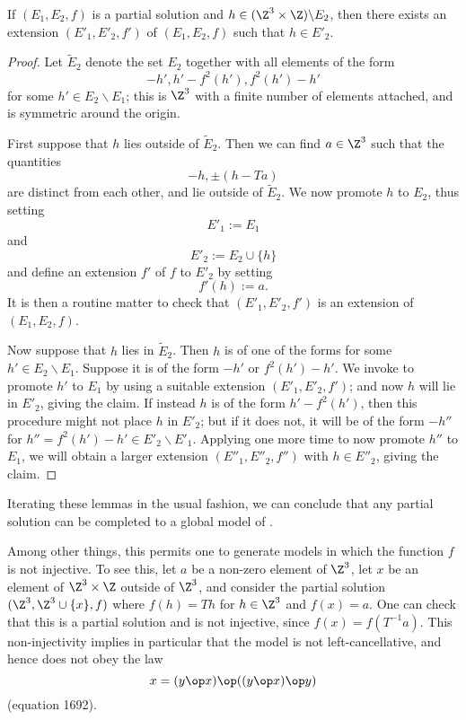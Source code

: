 \begin{lemma}[Promoting to $E_2$]\label{add-E2}  If $(E_1,E_2,f)$ is a partial solution and $h \in (\Z^3 \times \Z) \backslash E_2$, then there exists an extension $(E'_1,E'_2,f')$ of $(E_1,E_2,f)$ such that $h \in E'_2$.
\end{lemma}

\begin{proof}  Let $\tilde E_2$ denote the set $E_2$ together with all elements of the form
\begin{equation}\label{hp-form}
 -h', h' - f^2(h'), f^2(h') - h'
\end{equation}
for some $h' \in E_2 \backslash E_1$; this is $\Z^3$ with a finite number of elements attached, and is symmetric around the origin.

First suppose that $h$ lies outside of $\tilde E_2$.  Then we can find $a \in \Z^3$ such that the quantities
$$ -h, \pm (h - Ta)$$
are distinct from each other, and lie outside of $\tilde E_2$.  We now promote $h$ to $E_2$, thus setting
$$ E'_1 := E_1$$
and
$$ E'_2 := E_2 \cup \{h\}$$
and define an extension $f'$ of $f$ to $E'_2$ by setting
$$ f'(h) := a.$$
It is then a routine matter to check that $(E'_1,E'_2,f')$ is an extension of $(E_1,E_2,f)$.

Now suppose that $h$ lies in $\tilde E_2$.  Then $h$ is of one of the forms  for some $h' \in E_2 \backslash E_1$.  Suppose it is of the form $-h'$ or $f^2(h') - h'$.  We invoke  to promote $h'$ to $E_1$ by using a suitable extension $(E'_1,E'_2,f')$; and now $h$ will lie in $E'_2$, giving the claim.  If instead $h$ is of the form $h'-f^2(h')$, then this procedure might not place $h$ in $E'_2$; but if it does not, it will be of the form $-h''$ for $h'' = f^2(h')-h' \in E'_2 \backslash E'_1$.  Applying  one more time to now promote $h''$ to $E_1$, we will obtain a larger extension $(E''_1,E''_2,f'')$ with $h \in E''_2$, giving the claim.
\end{proof}

Iterating these lemmas in the usual fashion, we can conclude that any partial solution can be completed to a global model of .

Among other things, this permits one to generate models in which the function $f$ is not injective.  To see this, let $a$ be a non-zero element of $\Z^3$, let $x$ be an element of $\Z^3 \times \Z$ outside of $\Z^3$, and consider the partial solution $(\Z^3, \Z^3 \cup \{x\}, f)$ where $f(h) = Th$ for $h \in \Z^3$ and $f(x) = a$.  One can check that this is a partial solution and is not injective, since $f(x) = f(T^{-1} a)$.  This non-injectivity implies in particular that the model is not left-cancellative, and hence does not obey the law
$$ x = (y \op x) \op ((y \op x) \op y)$$
(equation 1692).

